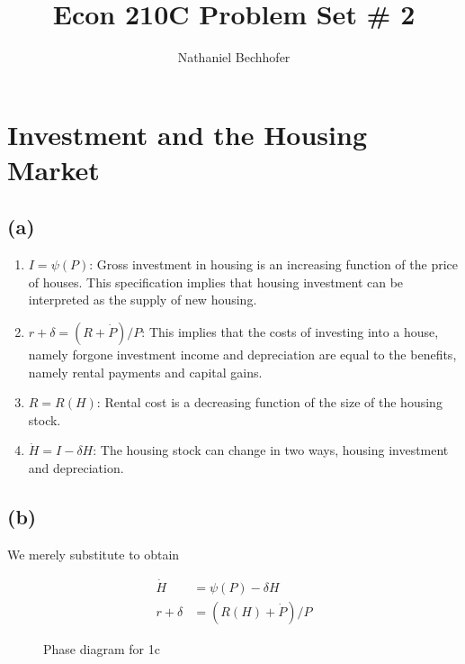 \documentclass[11pt]{amsart}
\title{Econ 210C Problem Set \# 2}
\author{Nathaniel Bechhofer}
\begin{document}
\maketitle

\section{Investment and the Housing Market}

\subsection*{(a)}
\begin{enumerate}
	\item $I = \psi (P)$: Gross investment in housing is an increasing function of the price of houses. This specification implies that housing investment can be interpreted as the supply of new housing. 
	\item $r + \delta = (R + \dot{P})/P$: This implies that the costs of investing into a house, namely forgone investment income and depreciation are equal to the benefits, namely rental payments and capital gains. 
	\item $R = R(H)$: Rental cost is a decreasing function of the size of the housing stock. 
	\item $\dot{H} = I - \delta H$: The housing stock can change in two ways, housing investment and depreciation.
\end{enumerate}

\subsection*{(b)}

We merely substitute to obtain

\begin{align*}
\dot{H} &= \psi(P) - \delta H \\
r + \delta &= (R(H) + \dot{P}) / P
\end{align*}




\begin{figure}[htbp]
\begin{center}
\caption{Phase diagram for 1c}
\label{1c}
\end{center}
\end{figure}
\end{document}
